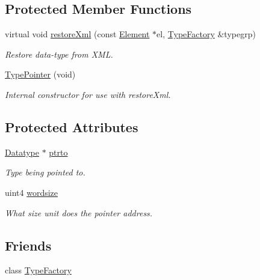 \subsection*{Protected Member Functions}
\begin{DoxyCompactItemize}
\item 
virtual void \mbox{\hyperlink{class_type_pointer_a8f62fbff5e735eb8ad562878bc5efed7}{restore\+Xml}} (const \mbox{\hyperlink{class_element}{Element}} $\ast$el, \mbox{\hyperlink{class_type_factory}{Type\+Factory}} \&typegrp)
\begin{DoxyCompactList}\small\item\em Restore data-\/type from X\+ML. \end{DoxyCompactList}\item 
\mbox{\hyperlink{class_type_pointer_aa70c8251d0da1b243d248951366c06c7}{Type\+Pointer}} (void)
\begin{DoxyCompactList}\small\item\em Internal constructor for use with restore\+Xml. \end{DoxyCompactList}\end{DoxyCompactItemize}
\subsection*{Protected Attributes}
\begin{DoxyCompactItemize}
\item 
\mbox{\hyperlink{class_datatype}{Datatype}} $\ast$ \mbox{\hyperlink{class_type_pointer_aa8c502781518e5f51b3020ddd4ac9fe1}{ptrto}}
\begin{DoxyCompactList}\small\item\em Type being pointed to. \end{DoxyCompactList}\item 
uint4 \mbox{\hyperlink{class_type_pointer_a32eee64befc16e8200d81477a5846ec6}{wordsize}}
\begin{DoxyCompactList}\small\item\em What size unit does the pointer address. \end{DoxyCompactList}\end{DoxyCompactItemize}
\subsection*{Friends}
\begin{DoxyCompactItemize}
\item 
class \mbox{\hyperlink{class_type_pointer_ac8c1945d0a63785e78b3e09a13226ed6}{Type\+Factory}}
\end{DoxyCompactItemize}
